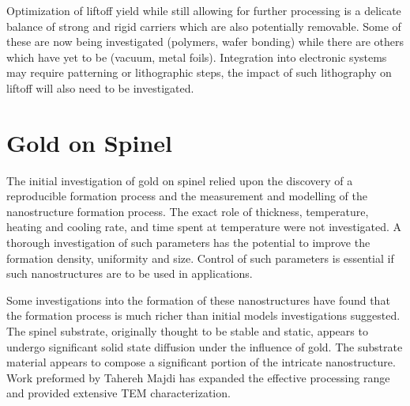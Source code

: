Optimization of liftoff yield while still allowing for further processing is a delicate balance of strong and rigid carriers which are also potentially removable.
Some of these are now being investigated (polymers, wafer bonding) while there are others which have yet to be (vacuum, metal foils).
Integration into electronic systems may require patterning or lithographic steps, the impact of such lithography on liftoff will also need to be investigated.

\section{Gold on Spinel}
The initial investigation of gold on spinel relied upon the discovery of a reproducible formation process and the measurement and modelling of the nanostructure formation process.
The exact role of thickness, temperature, heating and cooling rate, and time spent at temperature were not investigated.
A thorough investigation of such parameters has the potential to improve the formation density, uniformity and size.
Control of such parameters is essential if such nanostructures are to be used in applications.

Some investigations into the formation of these nanostructures have found that the formation process is much richer than initial models investigations suggested.
The spinel substrate, originally thought to be stable and static, appears to undergo significant solid state diffusion under the influence of gold.
The substrate material appears to compose a significant portion of the intricate nanostructure.
Work preformed by Tahereh Majdi has expanded the effective processing range and provided extensive TEM characterization\cite{tara-thesis}.
